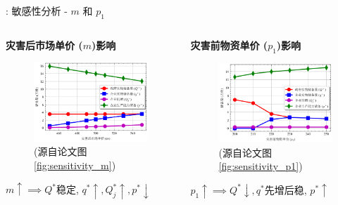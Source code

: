 \documentclass[9pt]{beamer}
\begin{document}
\begin{frame}{\insertsectionhead: 敏感性分析 - $m$ 和 $p_1$}
    \begin{columns}[T]
        \begin{column}{0.5\textwidth}
            \textbf{灾害后市场单价 ($m$)影响}
            \begin{figure}
                \includegraphics[width=\linewidth]{basic_pictures/sensitivity_m.png}
                \caption*{(源自论文图 \ref{fig:sensitivity_m})}
            \end{figure}
            \footnotesize $m \uparrow \implies Q^*$稳定, $q^* \uparrow, Q_j^* \uparrow, p^* \downarrow$
        \end{column}
        \begin{column}{0.5\textwidth}
            \textbf{灾害前物资单价 ($p_1$)影响}
            \begin{figure}
                \includegraphics[width=\linewidth]{basic_pictures/sensitivity_p1.png}
                \caption*{(源自论文图 \ref{fig:sensitivity_p1})}
            \end{figure}
            \footnotesize $p_1 \uparrow \implies Q^* \downarrow, q^*$先增后稳, $p^* \uparrow$
        \end{column}
    \end{columns}
\end{frame}
\end{document}
